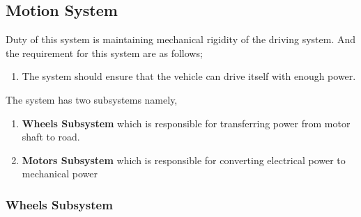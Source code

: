 \documentclass[a4paper,12pt]{article}
\begin{document}
\subsection{Motion System}


Duty of this system is maintaining mechanical rigidity of the driving system. And the requirement for this system are as follows;


\begin{enumerate}

\item The system should ensure that the vehicle can drive itself with enough power.	

\end{enumerate}	



The system has two subsystems namely,


\begin{enumerate}

\item \textbf{Wheels Subsystem} which is responsible for transferring power from motor shaft to road.

\item \textbf{Motors Subsystem} which is responsible for converting electrical power to mechanical power

\end{enumerate}


\subsubsection{Wheels Subsystem}
\end{document}
